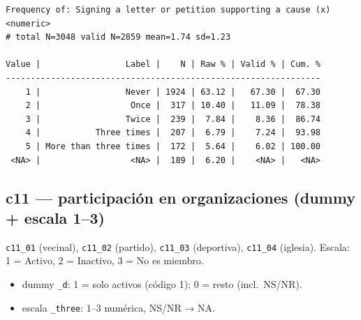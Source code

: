 \documentclass[
  letterpaper,
  DIV=11,
  numbers=noendperiod]{scrreprt}
\newenvironment{Shaded}{\begin{snugshade}}{\end{snugshade}}
\newcommand{\FunctionTok}[1]{\textcolor[rgb]{0.28,0.35,0.67}{#1}}
\newcommand{\NormalTok}[1]{\textcolor[rgb]{0.00,0.23,0.31}{#1}}
\newcommand{\SpecialCharTok}[1]{\textcolor[rgb]{0.37,0.37,0.37}{#1}}
\providecommand{\tightlist}{%
  \setlength{\itemsep}{0pt}\setlength{\parskip}{0pt}}
\begin{document}
\begin{Shaded}
\end{Shaded}

\begin{verbatim}
Frequency of: Signing a letter or petition supporting a cause (x) <numeric> 
# total N=3048 valid N=2859 mean=1.74 sd=1.23

Value |                 Label |    N | Raw % | Valid % | Cum. %
---------------------------------------------------------------
    1 |                 Never | 1924 | 63.12 |   67.30 |  67.30
    2 |                  Once |  317 | 10.40 |   11.09 |  78.38
    3 |                 Twice |  239 |  7.84 |    8.36 |  86.74
    4 |           Three times |  207 |  6.79 |    7.24 |  93.98
    5 | More than three times |  172 |  5.64 |    6.02 | 100.00
 <NA> |                  <NA> |  189 |  6.20 |    <NA> |   <NA>
\end{verbatim}

\subsection{c11 --- participación en organizaciones (dummy + escala
1--3)}\label{c11-participaciuxf3n-en-organizaciones-dummy-escala-13}

\texttt{c11\_01} (vecinal), \texttt{c11\_02} (partido), \texttt{c11\_03}
(deportiva), \texttt{c11\_04} (iglesia). Escala: 1 = Activo, 2 =
Inactivo, 3 = No es miembro.

\begin{itemize}
\tightlist
\item
  dummy \texttt{\_d}: 1 = solo activos (código 1); 0 = resto
  (incl.~NS/NR).
\item
  escala \texttt{\_three}: 1--3 numérica, NS/NR → NA.
\end{itemize}
\end{document}
